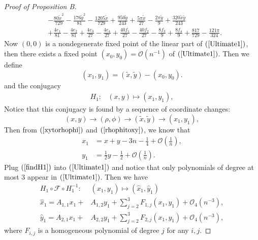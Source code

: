 \documentclass{article}
\numberwithin{figure}{section}
\numberwithin{equation}{section}
\theoremstyle{remark}
\theoremstyle{definition}
\begin{document}
\begin{proof}[Proof of Proposition B]
\begin{equation}
\begin{split}
       &-\frac{80\tilde{x}^2 }{729}-\frac{176\tilde{y}^2 }{81}-\frac{1205\tilde{x}}{729}+\frac{950\tilde{y}}{243}+\frac{5\pi \tilde{x}}{27}-\frac{2\pi \tilde{y}}{9}+\frac{320\tilde{x}\tilde{y}}{243}\\
       &+\frac{4e_1 }{81}-\frac{4e_2 }{81}+\frac{4e_3 }{27}-\frac{4e_4 }{27}+\frac{40f_1 }{27}-\frac{40f_2 }{27}-\frac{8f_3 }{9}+\frac{8f_4 }{9}+\frac{817}{729}-\frac{121\pi }{324}.
       \end{split}
   \end{equation}
Now $(0,0)$ is a nondegenerate fixed point of the linear part of $(\ref{Ultimate1})$, then there exists a fixed point $(x_0,y_0)=\mathcal{O}(n^{-1})$ of $(\ref{Ultimate1})$. Then we define
\begin{equation}\label{findH1}
        (x_1,y_1)=(\tilde{x},\tilde{y})-(x_0,y_0).
\end{equation}
and the conjugacy 
\begin{align}
H_1:&(x,y)\mapsto(x_1,y_1),
\end{align}
Notice that this conjugacy is found by a sequence of coordinate changes:
$$(x,y)\rightarrow(\rho,\phi)\rightarrow(\tilde{x},\tilde{y})\rightarrow(x_1,y_1),$$
Then from $(\ref{xytorhophi})$ and $(\ref{rhophitoxy})$, we know that 
\begin{equation}
    \begin{split}
        x_1&=x+y-3n-\frac{1}{4}+\mathcal{O}\left(\frac{1}{n}\right),\\
        y_1&=\frac{1}{2}y-\frac{1}{2}+\mathcal{O}\left(\frac{1}{n}\right).
    \end{split}
\end{equation}
Plug $(\ref{findH1})$ into $(\ref{Ultimate1})$  and notice that only polynomials of degree at most 3 appear in $(\ref{Ultimate1})$. Then we have
    \begin{equation}
		\begin{split}
			H_1\circ \mathcal{F}\circ H_1^{-1}:&\left( x_{1},y_{1} \right)\mapsto ({\widehat{x}}_{1},{\widehat{y}}_{1})\\
			{\widehat{x}}_{1} = A_{1,1}x_{1} +& A_{1,2}y_{1} + \sum_{j = 2}^{3}{F_{1,j}\left( x_{1},y_{1} \right)}+\mathcal{O}_4\left( n^{- 3} \right),\\
			{\widehat{y}}_{1} = A_{2,1}x_{1} + &A_{2,2}y_{1} + \sum_{j = 2}^{3}{F_{2,j}\left( x_{1},y_{1} \right)}+  \mathcal{O}_4\left( n^{- 3} \right),\end{split}
	\end{equation}
    where $F_{i,j}$ is a homogeneous polynomial of degree $j$ for any $i,j$.
    

\end{proof}
\end{document}
